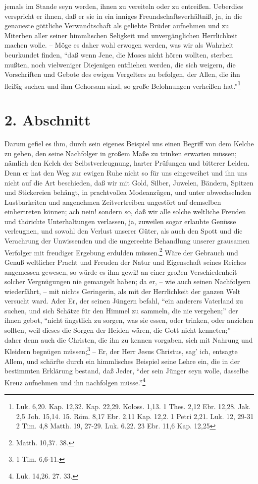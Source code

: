 jemals im Stande seyn werden, ihnen zu vereiteln oder zu entreißen. Ueberdies
verspricht er ihnen, daß er sie in ein inniges Freundschaftsverhältniß, ja, in
die genaueste göttliche Verwandtschaft als geliebte Brüder aufnehmen und zu
Miterben aller seiner himmlischen Seligkeit und unvergänglichen Herrlichkeit
machen wolle. -- Möge es daher wohl erwogen werden, was wir als Wahrheit
beurkundet finden, "`daß wenn Jene, die Moses nicht hören wollten, sterben
mußten, noch vielweniger Diejenigen entfliehen werden, die sich weigern, die
Vorschriften und Gebote des ewigen Vergelters zu befolgen, der Allen, die ihn
fleißig suchen und ihm Gehorsam sind, so große Belohnungen verheißen
hat."'\footnote{Luk. 6,20. Kap. 12,32. Kap. 22,29. Koloss. 1,13. 1 Thes. 2,12
Ebr. 12,28. Jak. 2,5 Joh. 15,14. 15. Röm. 8,17 Ebr. 2,11  Kap. 12,2. 1 Petri
2,21. Luk. 12, 29-31 2 Tim. 4,8 Matth. 19, 27-29. Luk. 6.22. 23 Ebr. 11,6 Kap.
12,25}

\section{2. Abschnitt}

Darum gefiel es ihm, durch sein eigenes Beispiel uns einen Begriff von dem
Kelche zu geben, den seine Nachfolger in großem Maße zu trinken erwarten müssen;
nämlich den Kelch der Selbstverleugnung, harter Prüfungen und bitterer Leiden.
Denn er hat den Weg zur ewigen Ruhe nicht so für uns eingeweihet und ihn uns
nicht auf die Art beschieden, daß wir mit Gold, Silber, Juwelen, Bändern,
Spitzen und Stickereien behängt, in prachtvollea Modeanzügen, und unter
abwechselnden Lustbarkeiten und angenehmen Zeitvertreiben ungestört auf
demselben einhertreten können; ach nein! sondern so, daß wir alle solche
weltliche Freuden und thörichte Unterhaltungen verlassen, ja, zuweilen sogar
erlaubte Genüsse verleugnen, und sowohl den Verlust unserer Güter, als auch den
Spott und die Verachrung der Unwissenden und die ungereehte Behandlung unserer
grausamen Verfolger mit freudiger Ergebung erdulden müssen.\footnote{Matth.
10,37. 38. } Wäre der Gebrauch und Genuß weltlicher Pracht und Freuden der Natur
und Eigenschaft seines Reiches angemessen gewesen, so würde es ihm gewiß an
einer großen Verschiedenheit solcher Vergnügungen nie gemangelt haben; da er, --
wie auch seinen Nachfolgern wiederfährt, -- mit nichts Geringerin, als mit der
Herrlichkeit der ganzen Welt versucht ward. Ader Er, der seinen Jüngern befahl,
"`ein anderers Vaterland zu suchen, und sich Schätze für den Himmel zu sammeln,
die nie vergehen;"' der ihnen gebot, "`nicht ängstlich zu sorgen, was sie essen,
oder trinken, oder anziehen sollten, weil dieses die Sorgen der Heiden wären,
die Gott nicht kenneten;"' – daher denn auch die Christen, die ihn zu kennen
vorgaben, sich mit Nahrung und Kleidern begnügen müssen;\footnote{1 Tim.
6,6-11.} -- Er, der Herr Jesus Christus, sag’ ich, entsagte Allem, und schärfte
durch ein himmlisches Beispiel seine Lehre ein, die in der bestimmten Erklärung
bestand, daß Jeder, "`der sein Jünger seyn wolle, dasselbe Kreuz aufnehmen und
ihn nachfolgen müsse."'\footnote{Luk. 14,26. 27. 33.}

